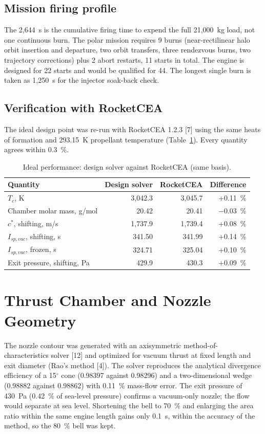 \documentclass[10pt]{article}
\begin{document}
\subsection{Mission firing profile}
The 2{,}644~s is the cumulative firing time to expend the full 21{,}000~kg load, not one continuous burn. The polar
mission requires 9 burns (near-rectilinear halo orbit insertion and departure, two orbit transfers, three rendezvous
burns, two trajectory corrections) plus 2 abort restarts, 11 starts in total. The engine is designed for 22 starts and
would be qualified for 44. The longest single burn is taken as 1{,}250~s for the injector soak-back check.

\subsection{Verification with RocketCEA}\label{sec:cea}
The ideal design point was re-run with RocketCEA 1.2.3 [7] using the same heats of formation and 293.15~K propellant
temperature (Table~\ref{tab:cea}). Every quantity agrees within 0.3~\%.
\begin{table}[H]\centering\small\caption{Ideal performance: design solver against RocketCEA (same basis).}\label{tab:cea}
\begin{tabular}{lrrr}\toprule
Quantity & Design solver & RocketCEA & Difference \\\midrule
$T_c$, K & 3{,}042.3 & 3{,}045.7 & +0.11~\% \\
Chamber molar mass, g/mol & 20.42 & 20.41 & $-0.03$~\% \\
$c^*$, shifting, m/s & 1{,}737.9 & 1{,}739.4 & +0.08~\% \\
$I_{sp,vac}$, shifting, s & 341.50 & 341.99 & +0.14~\% \\
$I_{sp,vac}$, frozen, s & 324.71 & 325.04 & +0.10~\% \\
Exit pressure, shifting, Pa & 429.9 & 430.3 & +0.09~\% \\
\bottomrule\end{tabular}\end{table}

\section{Thrust Chamber and Nozzle Geometry}
The nozzle contour was generated with an axisymmetric method-of-characteristics solver [12] and optimized for vacuum
thrust at fixed length and exit diameter (Rao's method [4]). The solver reproduces the analytical divergence efficiency
of a 15$^\circ$ cone (0.98397 against 0.98296) and a two-dimensional wedge (0.98882 against 0.98862) with 0.11~\%
mass-flow error. The exit pressure of 430~Pa (0.42~\% of sea-level pressure) confirms a vacuum-only nozzle; the flow
would separate at sea level. Shortening the bell to 70~\% and enlarging the area ratio within the same engine length
gains only 0.1~s, within the accuracy of the method, so the 80~\% bell was kept.
\end{document}
